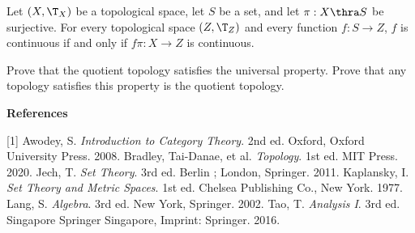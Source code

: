 \documentclass[10pt]{article}
\begin{document}
\begin{Universal property for quotient topology}
    Let $(X,{\T}_{X})$ be a topological space, let $S$ be a set, and let $\pi:X\thra S$ be surjective. For every topological space $(Z,{\T}_{Z})$ and every function $f:S\to Z$, $f$ is continuous if and only if $f\pi:X\to Z$ is continuous.
\end{Universal property for quotient topology}
\begin{center}
\end{center}
\begin{problem}
    Prove that the quotient topology satisfies the universal property. Prove that any topology satisfies this property is the quotient topology.
\end{problem}

\vspace{\baselineskip}
\begin{center}
    \large\bfseries References\normalsize
\end{center}
[1] Awodey, S. \textit{Introduction to Category Theory}. 2nd ed. Oxford, Oxford University Press. 2008.
\newline
[2] Bradley, Tai-Danae, et al. \textit{Topology}. 1st ed. MIT Press. 2020.
\newline
[3] Jech, T. \textit{Set Theory}. 3rd ed. Berlin ; London, Springer. 2011.
\newline
[4] Kaplansky, I. \textit{Set Theory and Metric Spaces}. 1st ed. Chelsea Publishing Co., New York. 1977.
\newline
[5] Lang, S. \textit{Algebra}. 3rd ed. New York, Springer. 2002.
\newline
[6] Tao, T. \textit{Analysis I}. 3rd ed. Singapore Springer Singapore, Imprint: Springer. 2016.
\hindex 
\end{document}
